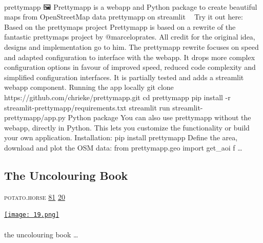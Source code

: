 \documentclass[10pt,a4paper]{article}
\begin{document}
\begin{multicols}{2}
\paragraph{}
prettymapp 🖼️
Prettymapp is a webapp and Python package to create beautiful maps from OpenStreetMap data
prettymapp on streamlit 🎈🎈 Try it out here:
Based on the prettymaps project
Prettymapp is based on a rewrite of the fantastic prettymaps project by @marceloprates. All credit for the original idea, designs and implementation go to him. The prettymapp rewrite focuses on speed and adapted configuration to interface with the webapp. It drops more complex configuration options in favour of improved speed, reduced code complexity and simplified configuration interfaces. It is partially tested and adds a streamlit webapp component.
Running the app locally
git clone https://github.com/chrieke/prettymapp.git cd prettymapp pip install -r streamlit-prettymapp/requirements.txt streamlit run streamlit-prettymapp/app.py
Python package
You can also use prettymapp without the webapp, directly in Python. This lets you customize the functionality or build your own application.
Installation:
pip install prettymapp
Define the area, download and plot the OSM data:
from prettymapp.geo import get\_aoi f
\dots\par
\noindent\begin{minipage}{\linewidth}
\medskip
\subsection{The Uncolouring Book}
\textsc{\footnotesize
{\scriptsize\faGlobe}\space 
potato.horse 
{\scriptsize\faThumbsOUp}\space 
\href{http://news.ycombinator.com/item?id=37208248\&utm\_term=comment}{81} 
{\scriptsize\faComments}\space 
\href{http://news.ycombinator.com/item?id=37208248\&utm\_term=comment}{20} 
}
\par\medskip\noindent
\href{https://lines.potato.horse?utm\_source=hackernewsletter\&utm\_medium=email\&utm\_term=show\_hn}{
    \texttt{[image: 19.png]}
}
\end{minipage}
\paragraph{}
the uncolouring book
\dots\par
\end{multicols}
\end{document}
